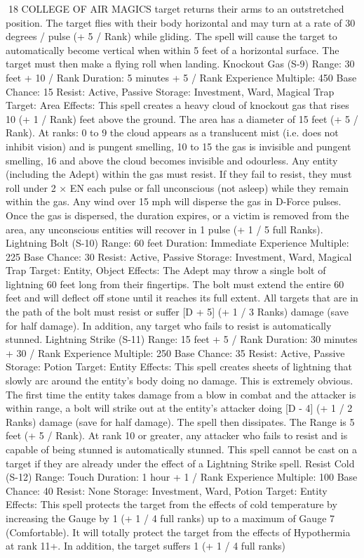 \documentclass[a4paper]{article}
\begin{document}
\begin{multicols}{3}
18 COLLEGE OF AIR MAGICS
target returns their arms to an outstretched position.
The target flies with their body horizontal and may
turn at a rate of 30 degrees / pulse (+ 5 / Rank)
while gliding. The spell will cause the target to
automatically become vertical when within 5 feet
of a horizontal surface. The target must then make
a flying roll when landing.
Knockout Gas (S-9)
Range: 30 feet + 10 / Rank
Duration: 5 minutes + 5 / Rank
Experience Multiple: 450
Base Chance: 15%
Resist: Active, Passive
Storage: Investment, Ward, Magical Trap
Target: Area
Effects: This spell creates a heavy cloud of knockout gas that rises 10 (+ 1 / Rank) feet above the
ground. The area has a diameter of 15 feet (+ 5 /
Rank). At ranks: 0 to 9 the cloud appears as a
translucent mist (i.e. does not inhibit vision) and is
pungent smelling, 10 to 15 the gas is invisible and
pungent smelling, 16 and above the cloud becomes
invisible and odourless. Any entity (including the
Adept) within the gas must resist. If they fail to
resist, they must roll under 2 × EN each pulse or
fall unconscious (not asleep) while they remain
within the gas. Any wind over 15 mph will disperse the gas in D-Force pulses. Once the gas is
dispersed, the duration expires, or a victim is removed from the area, any unconscious entities will
recover in 1 pulse (+ 1 / 5 full Ranks).
Lightning Bolt (S-10)
Range: 60 feet
Duration: Immediate
Experience Multiple: 225
Base Chance: 30%
Resist: Active, Passive
Storage: Investment, Ward, Magical Trap
Target: Entity, Object
Effects: The Adept may throw a single bolt of
lightning 60 feet long from their fingertips. The
bolt must extend the entire 60 feet and will deflect
off stone until it reaches its full extent. All targets
that are in the path of the bolt must resist or suffer
[D + 5] (+ 1 / 3 Ranks) damage (save for half damage). In addition, any target who fails to resist is
automatically stunned.
Lightning Strike (S-11)
Range: 15 feet + 5 / Rank
Duration: 30 minutes + 30 / Rank
Experience Multiple: 250
Base Chance: 35%
Resist: Active, Passive
Storage: Potion
Target: Entity
Effects: This spell creates sheets of lightning that
slowly arc around the entity’s body doing no damage. This is extremely obvious. The first time the
entity takes damage from a blow in combat and the
attacker is within range, a bolt will strike out at the
entity’s attacker doing [D - 4] (+ 1 / 2 Ranks)
damage (save for half damage). The spell then
dissipates. The Range is 5 feet (+ 5 / Rank). At
rank 10 or greater, any attacker who fails to resist
and is capable of being stunned is automatically
stunned. This spell cannot be cast on a target if
they are already under the effect of a Lightning
Strike spell.
Resist Cold (S-12)
Range: Touch
Duration: 1 hour + 1 / Rank
Experience Multiple: 100
Base Chance: 40%
Resist: None
Storage: Investment, Ward, Potion
Target: Entity
Effects: This spell protects the target from the
effects of cold temperature by increasing the
Gauge by 1 (+ 1 / 4 full ranks) up to a maximum of
Gauge 7 (Comfortable). It will totally protect the
target from the effects of Hypothermia at rank 11+.
In addition, the target suffers 1 (+ 1 / 4 full ranks)


\end{multicols}
\end{document}
